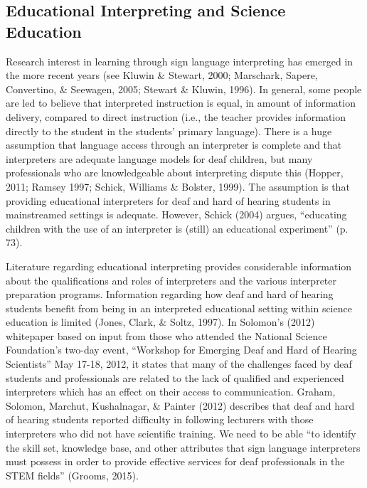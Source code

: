 \documentclass[11.5pt]{sig-alternate} %
\begin{document}
\begin{large}
\subsection*{Educational Interpreting and Science Education}

Research interest in learning through sign language interpreting has emerged in the more recent years (see Kluwin \& Stewart, 2000; Mar\-schark, Sapere, Convertino, \& Seewagen, 2005; Stewart \& Kluwin, 1996). In general, some people are led to believe that interpreted instruction is equal, in amount of information delivery, compared to direct instruction (i.e., the teacher provides information directly to the student in the students’ primary language). There is a huge assumption that language access through an interpreter is complete and that interpreters are adequate language models for deaf children, but many professionals who are knowledgeable about interpreting dispute this (Hopper, 2011; Ramsey 1997; Schick, Williams \& Bolster, 1999). The assumption is that providing educational interpreters for deaf and hard of hearing students in mainstreamed settings is adequate. However, Schick (2004) argues, “educating children with the use of an interpreter is (still) an educational experiment” (p. 73). 

Literature regarding educational interpreting provides considerable information about the qualifications and roles of interpreters and the various interpreter preparation programs. Information regarding how deaf and hard of hearing students benefit from being in an interpreted educational setting within science education is limited (Jones, Clark, \& Soltz, 1997). In Solomon’s (2012) whitepaper based on input from those who attended the National Science Foundation’s two-day event, “Workshop for Emerging Deaf and Hard of Hearing Scientists” May 17-18, 2012, it states that many of the challenges faced by deaf students and professionals are related to the lack of qualified and experienced interpreters which has an effect on their access to communication.   Graham, Solomon, Marchut, Kushalnagar, \& Painter (2012) describes that deaf and hard of hearing students reported difficulty in following lecturers with those interpreters who did not have scientific training. We need to be able “to identify the skill set, knowledge base, and other attributes that sign language interpreters must possess in order to provide effective services for deaf professionals in the STEM fields” (Grooms, 2015). 


\end{large}
\end{document}
